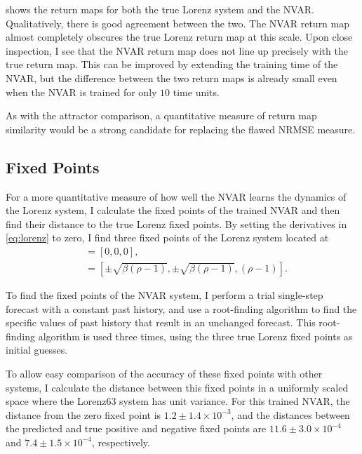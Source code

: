  shows the return maps for both the true
Lorenz system and the NVAR. Qualitatively, there is good agreement
between the two. The NVAR return map almost completely obscures the
true Lorenz return map at this scale. Upon close inspection, I see
that the NVAR return map does not line up precisely with the true
return map. This can be improved by extending the training time of the
NVAR, but the difference between the two return maps is already small
even when the NVAR is trained for only $10$ time units.

As with the attractor comparison, a quantitative measure of return map
similarity would be a strong candidate for replacing the flawed NRMSE
measure.

\subsection{Fixed Points}

For a more quantitative measure of how well the NVAR learns the
dynamics of the Lorenz system, I calculate the fixed points of the
trained NVAR and then find their distance to the true Lorenz fixed
points. By setting the derivatives in \cref{eq:lorenz} to zero, I
find three fixed points of the Lorenz system located at
\begin{align}
  [x, y, z] &= [0, 0, 0], \\
            &= [\pm \sqrt{\beta(\rho - 1)}, \pm \sqrt{\beta(\rho - 1)}, (\rho - 1)].
\end{align}

To find the fixed points of the NVAR system, I perform a trial
single-step forecast with a constant past history, and use a
root-finding algorithm to find the specific values of past history
that result in an unchanged forecast. This root-finding algorithm is
used three times, using the three true Lorenz fixed points as initial
guesses.

To allow easy comparison of the accuracy of these fixed points with
other systems, I calculate the distance between this fixed points in
a uniformly scaled space where the Lorenz63 system has unit
variance. For this trained NVAR, the distance from the zero fixed point
is $1.2\pm1.4\times10^{-3}$, and the distances between the predicted
and true positive and negative fixed points are
$11.6\pm3.0\times10^{-4}$ and $7.4\pm1.5\times10^{-4}$, respectively.

